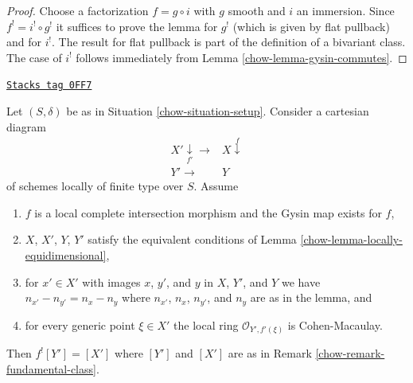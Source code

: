 \begin{proof}

Choose a factorization $f = g \circ i$ with $g$ smooth and $i$ an immersion.
Since $f^! = i^! \circ g^!$ it suffices to prove the lemma for $g^!$
(which is given by flat pullback) and for $i^!$. The result for flat pullback
is part of the definition of a bivariant class. The case of $i^!$ follows
immediately from Lemma \ref{chow-lemma-gysin-commutes}.
\end{proof}

\begin{lemma}
\label{chow-lemma-lci-gysin-easy}
\href{https://stacks.math.columbia.edu/tag/0FF7}{\texttt{Stacks tag 0FF7}}

Let $(S, \delta)$ be as in Situation \ref{chow-situation-setup}.
Consider a cartesian diagram
$$
\begin{array}{cc}X' \underset{f'}{\downarrow}\longrightarrow & X \overset{f}{\downarrow} \\ Y' \longrightarrow & Y\end{array}
$$
of schemes locally of finite type over $S$. Assume
\begin{enumerate}
\item $f$ is a local complete intersection morphism and
the Gysin map exists for $f$,
\item $X$, $X'$, $Y$, $Y'$ satisfy the equivalent conditions of
Lemma \ref{chow-lemma-locally-equidimensional},
\item for $x' \in X'$ with images $x$, $y'$, and $y$
in $X$, $Y'$, and $Y$ we have $n_{x'} - n_{y'} = n_x - n_y$
where $n_{x'}$, $n_x$, $n_{y'}$, and $n_y$ are as in the lemma, and
\item for every generic point $\xi \in X'$ the local ring
$\mathcal{O}_{Y', f'(\xi)}$ is Cohen-Macaulay.
\end{enumerate}
Then $f^![Y'] = [X']$ where $[Y']$ and $[X']$ are as in
Remark \ref{chow-remark-fundamental-class}.
\end{lemma}

